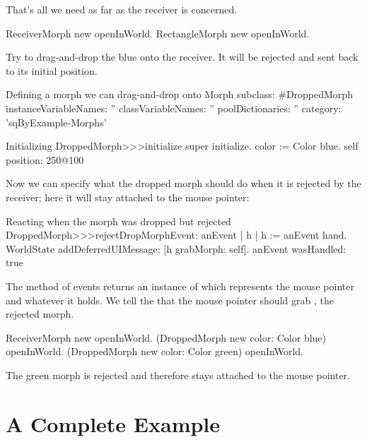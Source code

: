 \documentclass[a4paper,10pt,twoside]{book}
\begin{document}
That's all we need as far as the receiver is concerned.

\begin{code}{}
ReceiverMorph new openInWorld.
RectangleMorph new openInWorld.
\end{code}
\noindent
Try to drag-and-drop the blue  onto the receiver. It will be rejected and sent back to its initial position.

\begin{classdef}{Defining a morph we can drag-and-drop onto }
Morph subclass: #DroppedMorph
   instanceVariableNames: ''
   classVariableNames: ''
   poolDictionaries: ''
   category: 'sqByExample-Morphs'
\end{classdef}

\begin{method}{Initializing }
DroppedMorph>>>initialize
   super initialize.
   color := Color blue.
   self position: 250@100
\end{method}

Now we can specify what the dropped morph should do when it is rejected by the receiver; here it will stay attached to the mouse pointer:
\begin{method}{Reacting when the morph was dropped but rejected}
DroppedMorph>>>rejectDropMorphEvent: anEvent
   | h |
   h := anEvent hand.
   WorldState
      addDeferredUIMessage: [h grabMorph: self].
   anEvent wasHandled: true
\end{method}

The  method of events returns an instance of  which represents the mouse pointer and whatever it holds.
We tell the  that the mouse pointer should grab , the rejected morph.

\begin{code}{}
ReceiverMorph new openInWorld.
(DroppedMorph new color: Color blue) openInWorld.
(DroppedMorph new color: Color green) openInWorld.
\end{code}
\noindent
The green morph is rejected and therefore stays attached to the mouse pointer.

\section{A Complete Example}
\end{document}
